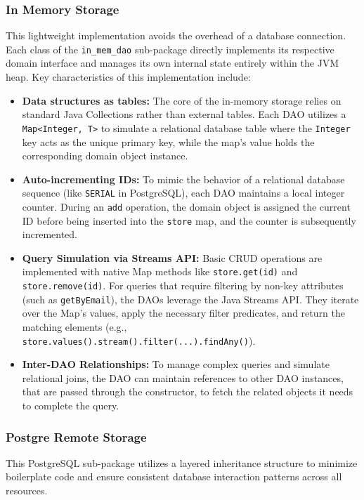 \subsubsection{In Memory Storage}
This lightweight implementation avoids the overhead of a database connection. 
Each class of the \texttt{in\_mem\_dao} sub-package directly implements its respective domain interface and manages its own internal state entirely within the JVM heap. Key characteristics of this implementation include:

\begin{itemize}
	\item \textbf{Data structures as tables:} The core of the in-memory storage relies on standard Java Collections rather than external tables. Each DAO utilizes a \texttt{Map<Integer, T>} to simulate a relational database table where the \texttt{Integer} key acts as the unique primary key, while the map's value holds the corresponding domain object instance.
	\item \textbf{Auto-incrementing IDs:} To mimic the behavior of a relational database sequence (like \texttt{SERIAL} in PostgreSQL), each DAO maintains a local integer counter. During an \texttt{add} operation, the domain object is assigned the current ID before being inserted into the \texttt{store} map, and the counter is subsequently incremented.
	\item \textbf{Query Simulation via Streams API:} Basic CRUD operations are implemented with native Map methods like \texttt{store.get(id)} and \texttt{store.remove(id)}. For queries that require filtering by non-key attributes (such as \texttt{getByEmail}), the DAOs leverage the Java Streams API. They iterate over the Map's values, apply the necessary filter predicates, and return the matching elements (e.g., \texttt{store.values().stream().filter(...).findAny()}).
	\item \textbf{Inter-DAO Relationships:} To manage complex queries and simulate relational joins, the DAO can maintain references to other DAO instances, that are passed through the constructor, to fetch the related objects it needs to complete the query.
\end{itemize}

\subsubsection{Postgre Remote Storage}
This PostgreSQL sub-package utilizes a layered inheritance structure to minimize boilerplate code and ensure consistent database interaction patterns across all resources.

